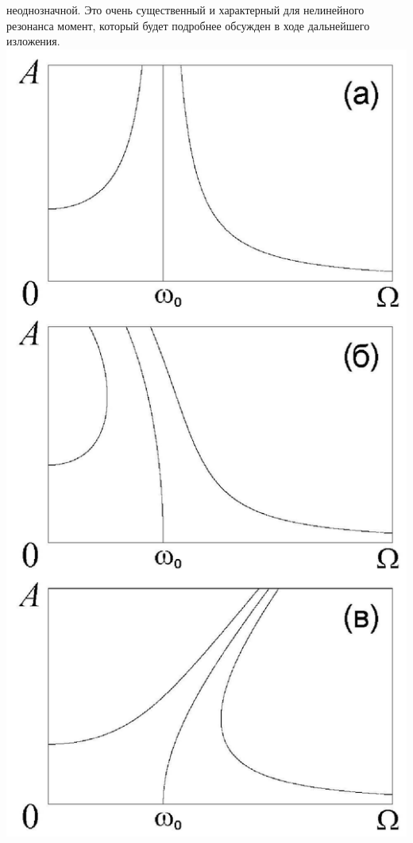 \documentclass[10pt]{article}
\begin{document}
неоднозначной. Это очень существенный и характерный для нелинейного резонанса момент, который будет подробнее обсужден в ходе дальнейшего изложения.\\
\includegraphics[max width=\textwidth, center]{2024_12_13_cd59585e7886a9efee75g-219}
\end{document}

